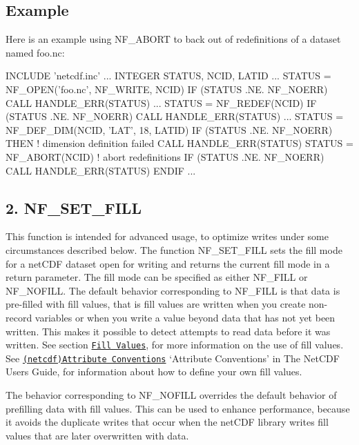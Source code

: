 \subsection*{Example }

Here is an example using N\+F\+\_\+\+A\+B\+O\+RT to back out of redefinitions of a dataset named foo.\+nc\+:


\begin{DoxyCode}
INCLUDE 'netcdf.inc'
   ...
INTEGER STATUS, NCID, LATID
   ...
STATUS = NF\_OPEN('foo.nc', NF\_WRITE, NCID)
IF (STATUS .NE. NF\_NOERR) CALL HANDLE\_ERR(STATUS)
   ...
STATUS = NF\_REDEF(NCID)
IF (STATUS .NE. NF\_NOERR) CALL HANDLE\_ERR(STATUS)
   ...
STATUS = NF\_DEF\_DIM(NCID, 'LAT', 18, LATID)
IF (STATUS .NE. NF\_NOERR) THEN  ! dimension definition failed
   CALL HANDLE\_ERR(STATUS)
   STATUS = NF\_ABORT(NCID)  ! abort redefinitions
   IF (STATUS .NE. NF\_NOERR) CALL HANDLE\_ERR(STATUS)
ENDIF
...
\end{DoxyCode}
\hypertarget{nc_f77_interface_guide_f77_NF-SET-FILL}{}\subsection{2. N\+F\+\_\+\+S\+E\+T\+\_\+\+F\+I\+L\+L }\label{nc_f77_interface_guide_f77_NF-SET-FILL}
This function is intended for advanced usage, to optimize writes under some circumstances described below. The function N\+F\+\_\+\+S\+E\+T\+\_\+\+F\+I\+LL sets the fill mode for a net\+C\+DF dataset open for writing and returns the current fill mode in a return parameter. The fill mode can be specified as either N\+F\+\_\+\+F\+I\+LL or N\+F\+\_\+\+N\+O\+F\+I\+LL. The default behavior corresponding to N\+F\+\_\+\+F\+I\+LL is that data is pre-\/filled with fill values, that is fill values are written when you create non-\/record variables or when you write a value beyond data that has not yet been written. This makes it possible to detect attempts to read data before it was written. See section \href{#Fill-Values}{\tt Fill Values}, for more information on the use of fill values. See \href{netcdf.html#Attribute-Conventions}{\tt (netcdf)Attribute Conventions} ‘\+Attribute Conventions’ in The Net\+C\+DF Users Guide, for information about how to define your own fill values.

The behavior corresponding to N\+F\+\_\+\+N\+O\+F\+I\+LL overrides the default behavior of prefilling data with fill values. This can be used to enhance performance, because it avoids the duplicate writes that occur when the net\+C\+DF library writes fill values that are later overwritten with data.

